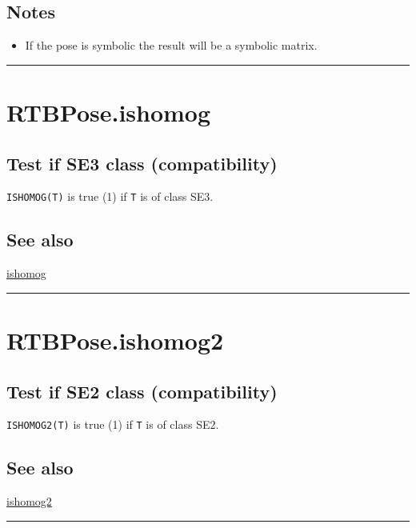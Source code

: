 \subsection*{Notes}
\begin{itemize}
  \item If the pose is symbolic the result will be a symbolic matrix.
\end{itemize}
\vspace{1.5ex}\hrule

\hypertarget{RTBPose.ishomog}{\section*{RTBPose.ishomog}}
\subsection*{Test if SE3 class (compatibility)}


\texttt{ISHOMOG(T)} is true (1) if \texttt{T} is of class SE3.


\subsection*{See also}


\hyperlink{ishomog}{\color{blue} ishomog}

\vspace{1.5ex}\hrule

\hypertarget{RTBPose.ishomog2}{\section*{RTBPose.ishomog2}}
\subsection*{Test if SE2 class (compatibility)}


\texttt{ISHOMOG2(T)} is true (1) if \texttt{T} is of class SE2.


\subsection*{See also}


\hyperlink{ishomog2}{\color{blue} ishomog2}

\vspace{1.5ex}\hrule

